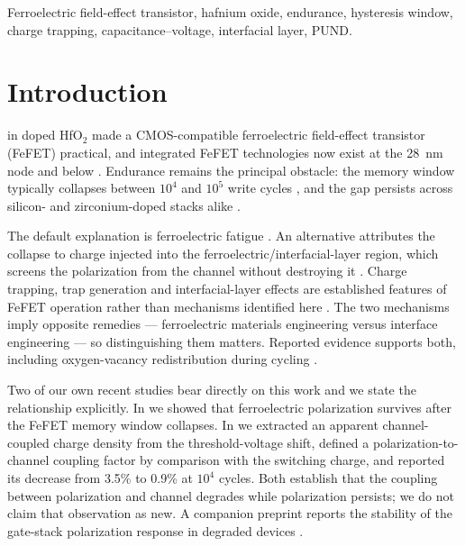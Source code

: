 \documentclass[journal]{IEEEtran}
\newcommand{\rev}[1]{#1}                    %
\begin{document}
\begin{IEEEkeywords}
Ferroelectric field-effect transistor, hafnium oxide, endurance,
hysteresis window, charge trapping, capacitance--voltage, interfacial
layer, PUND.
\end{IEEEkeywords}

\section{Introduction}
 in doped HfO$_2$ \cite{Fe1,Fe2} made a
CMOS-compatible ferroelectric field-effect transistor (FeFET) practical,
and integrated FeFET technologies now exist at the \SI{28}{\nano\meter}
node and below \cite{Khan2020,QLC_FeNAND}. Endurance remains the
principal obstacle: the memory window typically collapses between $10^4$
and $10^5$ write cycles \cite{Mulaosmanovic_2021,HKG_FeFET,HfO_SCM},
and the gap persists across silicon- and zirconium-doped stacks alike
\cite{endurance1,Device_life}.

The default explanation is ferroelectric fatigue \cite{fatigue}. An
alternative attributes the collapse to charge injected into the
ferroelectric/interfacial-layer region, which screens the polarization
from the channel without destroying it
\cite{Ref_DD_1,Charge_Trap_endurance,Toprasertpong,passlack}.
\rev{Charge trapping, trap generation and interfacial-layer effects are
established features of FeFET operation rather than mechanisms
identified here \cite{Tasneem,Trapping_dynamics,Defect_dynamics}.} The
two mechanisms imply opposite remedies --- ferroelectric materials
engineering \cite{Stability} versus interface engineering
\cite{endurance3,endurance4,AgnivaTSA} --- so distinguishing them
matters. Reported evidence supports both, including oxygen-vacancy
redistribution during cycling \cite{Oxygen_Vac,ref_1_OV,Ref_2OV}.

\rev{Two of our own recent studies bear directly on this work and we
state the relationship explicitly. In \cite{ACSAMI} we showed that
ferroelectric polarization survives after the FeFET memory window
collapses. In \cite{ACSAELM} we extracted an apparent channel-coupled
charge density from the threshold-voltage shift, defined a
polarization-to-channel coupling factor by comparison with the switching
charge, and reported its decrease from 3.5\% to 0.9\% at $10^4$ cycles.
Both establish that the coupling between polarization and channel
degrades while polarization persists; we do not claim that observation
as new. A companion preprint reports the stability of the gate-stack
polarization response in degraded devices \cite{preprint}.}
\end{document}
